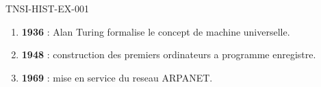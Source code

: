 \begin{corrige}{TNSI-HIST-EX-001}
\begin{enumerate}
  \item \textbf{1936} : Alan Turing formalise le concept de machine universelle.
  \item \textbf{1948} : construction des premiers ordinateurs a programme enregistre.
  \item \textbf{1969} : mise en service du reseau ARPANET.
\end{enumerate}
\end{corrige}
